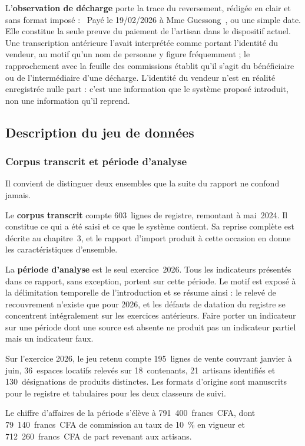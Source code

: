 L'\textbf{observation de décharge} porte la trace du reversement, rédigée en clair et sans format imposé : \guillemotleft~Payé le 19/02/2026 à Mme Guessong~\guillemotright, ou une simple date. Elle constitue la seule preuve du paiement de l'artisan dans le dispositif actuel. Une transcription antérieure l'avait interprétée comme portant l'identité du vendeur, au motif qu'un nom de personne y figure fréquemment ; le rapprochement avec la feuille des commissions établit qu'il s'agit du bénéficiaire ou de l'intermédiaire d'une décharge. L'identité du vendeur n'est en réalité enregistrée nulle part : c'est une information que le système proposé introduit, non une information qu'il reprend.

\subsection{Description du jeu de données}

\subsubsection{Corpus transcrit et période d'analyse}

Il convient de distinguer deux ensembles que la suite du rapport ne confond jamais.

Le \textbf{corpus transcrit} compte 603~lignes de registre, remontant à mai~2024. Il constitue ce qui a été saisi et ce que le système contient. Sa reprise complète est décrite au chapitre~3, et le rapport d'import produit à cette occasion en donne les caractéristiques d'ensemble.

La \textbf{période d'analyse} est le seul exercice~2026. Tous les indicateurs présentés dans ce rapport, sans exception, portent sur cette période. Le motif est exposé à la délimitation temporelle de l'introduction et se résume ainsi : le relevé de recouvrement n'existe que pour 2026, et les défauts de datation du registre se concentrent intégralement sur les exercices antérieurs. Faire porter un indicateur sur une période dont une source est absente ne produit pas un indicateur partiel mais un indicateur faux.

Sur l'exercice 2026, le jeu retenu compte 195~lignes de vente couvrant janvier à juin, 36~espaces locatifs relevés sur 18~contenants, 21~artisans identifiés et 130~désignations de produits distinctes. Les formats d'origine sont manuscrits pour le registre et tabulaires pour les deux classeurs de suivi.

Le chiffre d'affaires de la période s'élève à 791~400~francs~CFA, dont 79~140~francs~CFA de commission au taux de 10~\% en vigueur et 712~260~francs~CFA de part revenant aux artisans.

